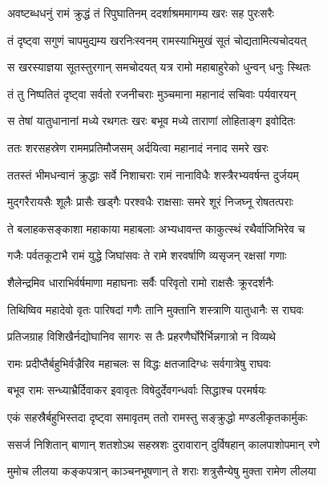 
\twolineshloka
{अवष्टब्धधनुं रामं क्रुद्धं तं रिपुघातिनम्}
{ददर्शाश्रममागम्य खरः सह पुरःसरैः} %

\twolineshloka
{तं दृष्ट्वा सगुणं चापमुद्यम्य खरनिःस्वनम्}
{रामस्याभिमुखं सूतं चोद्यतामित्यचोदयत्} %

\twolineshloka
{स खरस्याज्ञया सूतस्तुरगान् समचोदयत्}
{यत्र रामो महाबाहुरेको धुन्वन् धनुः स्थितः} %

\twolineshloka
{तं तु निष्पतितं दृष्ट्वा सर्वतो रजनीचराः}
{मुञ्चमाना महानादं सचिवाः पर्यवारयन्} %

\twolineshloka
{स तेषां यातुधानानां मध्ये रथगतः खरः}
{बभूव मध्ये ताराणां लोहिताङ्ग इवोदितः} %

\twolineshloka
{ततः शरसहस्रेण राममप्रतिमौजसम्}
{अर्दयित्वा महानादं ननाद समरे खरः} %

\twolineshloka
{ततस्तं भीमधन्वानं क्रुद्धाः सर्वे निशाचराः}
{रामं नानाविधैः शस्त्रैरभ्यवर्षन्त दुर्जयम्} %

\twolineshloka
{मुद्गरैरायसैः शूलैः प्रासैः खड्गैः परश्वधैः}
{राक्षसाः समरे शूरं निजघ्नू रोषतत्पराः} %

\twolineshloka
{ते बलाहकसङ्काशा महाकाया महाबलाः}
{अभ्यधावन्त काकुत्स्थं रथैर्वाजिभिरेव च} %

\twolineshloka
{गजैः पर्वतकूटाभै रामं युद्धे जिघांसवः}
{ते रामे शरवर्षाणि व्यसृजन् रक्षसां गणाः} %

\twolineshloka
{शैलेन्द्रमिव धाराभिर्वर्षमाणा महाघनाः}
{सर्वैः परिवृतो रामो राक्षसैः क्रूरदर्शनैः} %

\twolineshloka
{तिथिष्विव महादेवो वृतः पारिषदां गणैः}
{तानि मुक्तानि शस्त्राणि यातुधानैः स राघवः} %

\twolineshloka
{प्रतिजग्राह विशिखैर्नद्योघानिव सागरः}
{स तैः प्रहरणैर्घोरैर्भिन्नगात्रो न विव्यथे} %

\twolineshloka
{रामः प्रदीप्तैर्बहुभिर्वज्रैरिव महाचलः}
{स विद्धः क्षतजादिग्धः सर्वगात्रेषु राघवः} %

\twolineshloka
{बभूव रामः सन्ध्याभ्रैर्दिवाकर इवावृतः}
{विषेदुर्देवगन्धर्वाः सिद्धाश्च परमर्षयः} %

\twolineshloka
{एकं सहस्रैर्बहुभिस्तदा दृष्ट्वा समावृतम्}
{ततो रामस्तु सङ्क्रुद्धो मण्डलीकृतकार्मुकः} %

\twolineshloka
{ससर्ज निशितान् बाणान् शतशोऽथ सहस्रशः}
{दुरावारान् दुर्विषहान् कालपाशोपमान् रणे} %

\twolineshloka
{मुमोच लीलया कङ्कपत्रान् काञ्चनभूषणान्}
{ते शराः शत्रुसैन्येषु मुक्ता रामेण लीलया} %

